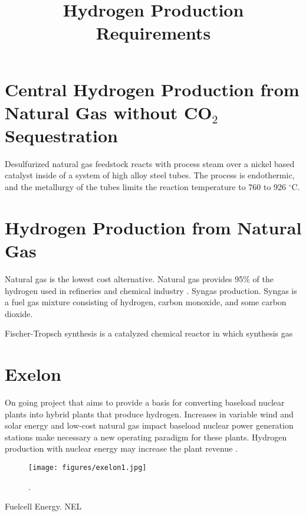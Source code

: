 \documentclass[11pt,letterpaper]{article}
\title{Hydrogen Production Requirements}
\begin{document}

\section{Central Hydrogen Production from Natural Gas without CO$_2$ Sequestration}

Desulfurized natural gas feedstock reacts with process steam over a nickel based catalyst inside of a system of high alloy steel tubes. The process is endothermic, and the metallurgy of the tubes limits the reaction temperature to 760 to 926 $^{\circ}$C.

\section{Hydrogen Production from Natural Gas}

Natural gas is the lowest cost alternative. Natural gas provides 95\% of the hydrogen used in refineries and chemical industry \cite{harstein_arthur_hydrogen_2003}. Syngas production. Syngas is a fuel gas mixture consisting of hydrogen, carbon monoxide, and some carbon dioxide.

Fischer-Tropsch synthesis is a catalyzed chemical reactor in which synthesis gas

\section{Exelon}

On going project that aims to provide a basis for converting baseload nuclear plants into hybrid plants that produce hydrogen.
Increases in variable wind and solar energy and low-cost natural gas impact baseload nuclear power generation stations make necessary a new operating paradigm for these plants.
Hydrogen production with nuclear energy may increase the plant revenue \cite{otgonbaatar_merchant_2019}.

\begin{figure}[] %
	\centering
	\texttt{[image: figures/exelon1.jpg]}
	\hfill
	\caption{ \cite{otgonbaatar_merchant_2019}.}
	\label{fig:ghg}
\end{figure}

Fuelcell Energy.
NEL
\end{document}
